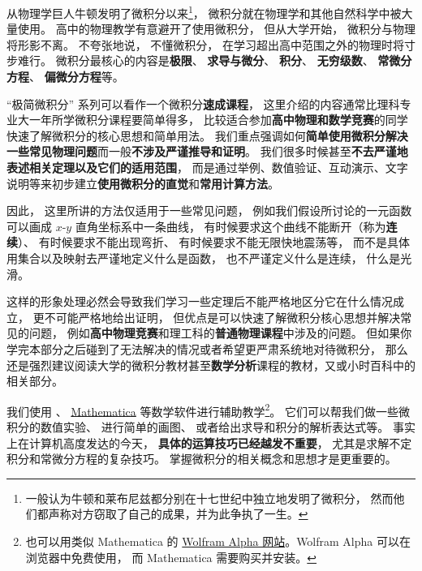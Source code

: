 
\begin{issues}
\issueDraft
\end{issues}

从物理学巨人牛顿发明了微积分以来\footnote{一般认为牛顿和莱布尼兹都分别在十七世纪中独立地发明了微积分， 然而他们都声称对方窃取了自己的成果，并为此争执了一生。}， 微积分就在物理学和其他自然科学中被大量使用。 高中的物理教学有意避开了使用微积分， 但从大学开始， 微积分与物理将形影不离。 不夸张地说， 不懂微积分， 在学习超出高中范围之外的物理时将寸步难行。 微积分最核心的内容是\textbf{极限}、 \textbf{求导与微分}、 \textbf{积分}、 \textbf{无穷级数}、 \textbf{常微分方程}、 \textbf{偏微分方程}等。

“极简微积分” 系列可以看作一个微积分\textbf{速成课程}， 这里介绍的内容通常比理科专业大一年所学微积分课程要简单得多， 比较适合参加\textbf{高中物理和数学竞赛}的同学快速了解微积分的核心思想和简单用法。 我们重点强调如何\textbf{简单使用微积分解决一些常见物理问题}而一般\textbf{不涉及严谨推导和证明}。 我们很多时候甚至\textbf{不去严谨地表述相关定理以及它们的适用范围}， 而是通过举例、数值验证、互动演示、文字说明等来初步建立\textbf{使用微积分的直觉}和\textbf{常用计算方法}。

因此， 这里所讲的方法仅适用于一些常见问题， 例如我们假设所讨论的一元函数可以画成 $x$-$y$ 直角坐标系中一条曲线， 有时候要求这个曲线不能断开（称为\textbf{连续}）、 有时候要求不能出现弯折、 有时候要求不能无限快地震荡等， 而不是具体用集合以及映射去严谨地定义什么是函数， 也不严谨定义什么是连续， 什么是光滑。

这样的形象处理必然会导致我们学习一些定理后不能严格地区分它在什么情况成立， 更不可能严格地给出证明， 但优点是可以快速了解微积分核心思想并解决常见的问题， 例如\textbf{高中物理竞赛}和理工科的\textbf{普通物理课程}中涉及的问题。 但如果你学完本部分之后碰到了无法解决的情况或者希望更严肃系统地对待微积分， 那么还是强烈建议阅读大学的微积分教材甚至\textbf{数学分析}课程的教材，又或小时百科中的相关部分。

我们使用 、 \href{https://www.wolfram.com/mathematica/}{Mathematica} 等数学软件进行辅助教学\footnote{也可以用类似 Mathematica 的 \href{https://www.wolframalpha.com/}{Wolfram Alpha 网站}。Wolfram Alpha 可以在浏览器中免费使用， 而 Mathematica 需要购买并安装。}。 它们可以帮我们做一些微积分的数值实验、 进行简单的画图、 或者给出求导和积分的解析表达式等。  事实上在计算机高度发达的今天， \textbf{具体的运算技巧已经越发不重要}， 尤其是求解不定积分和常微分方程的复杂技巧。 掌握微积分的相关概念和思想才是更重要的。

